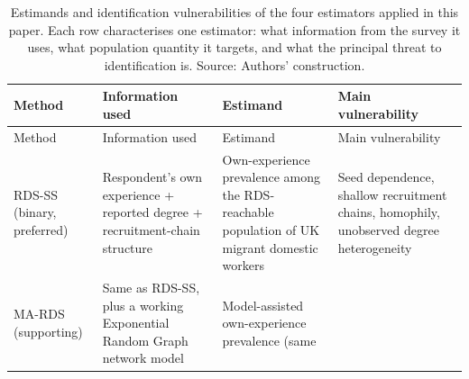 \documentclass[
  12pt,
  letterpaper,
  DIV=11,
  numbers=noendperiod]{scrartcl}
\begin{document}
\begin{longtable}[]{@{}
  >{\raggedright\arraybackslash}p{}
  >{\raggedright\arraybackslash}p{}
  >{\raggedright\arraybackslash}p{}
  >{\raggedright\arraybackslash}p{}@{}}
\caption{Estimands and identification vulnerabilities of the four
estimators applied in this paper. Each row characterises one estimator:
what information from the survey it uses, what population quantity it
targets, and what the principal threat to identification is. Source:
Authors' construction.}\label{tbl-estimands}\tabularnewline
\toprule\noalign{}
\begin{minipage}[b]{\linewidth}\raggedright
Method
\end{minipage} & \begin{minipage}[b]{\linewidth}\raggedright
Information used
\end{minipage} & \begin{minipage}[b]{\linewidth}\raggedright
Estimand
\end{minipage} & \begin{minipage}[b]{\linewidth}\raggedright
Main vulnerability
\end{minipage} \\
\midrule\noalign{}
\endfirsthead
\toprule\noalign{}
\begin{minipage}[b]{\linewidth}\raggedright
Method
\end{minipage} & \begin{minipage}[b]{\linewidth}\raggedright
Information used
\end{minipage} & \begin{minipage}[b]{\linewidth}\raggedright
Estimand
\end{minipage} & \begin{minipage}[b]{\linewidth}\raggedright
Main vulnerability
\end{minipage} \\
\midrule\noalign{}
\endhead
\bottomrule\noalign{}
\endlastfoot
RDS-SS (binary, preferred) & Respondent's own experience + reported
degree + recruitment-chain structure & Own-experience prevalence among
the RDS-reachable population of UK migrant domestic workers & Seed
dependence, shallow recruitment chains, homophily, unobserved degree
heterogeneity \\
MA-RDS (supporting) & Same as RDS-SS, plus a working Exponential Random
Graph network model & Model-assisted own-experience prevalence (same

\end{longtable}
\end{document}
